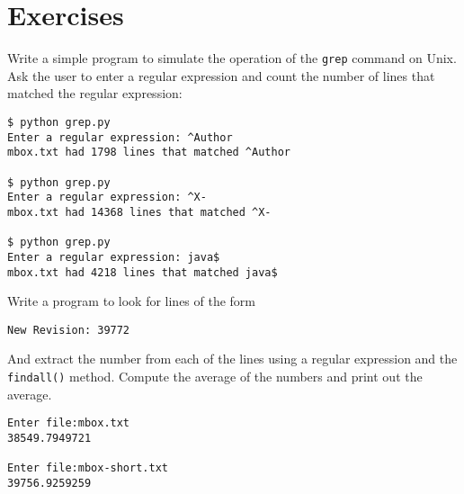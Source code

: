 \section{Exercises}

\begin{ex}
Write a simple program to simulate the operation of the {\tt grep} command 
on Unix.  Ask the user to enter a regular expression and count the number
of lines that matched the regular expression:

\beforeverb
\begin{verbatim}
$ python grep.py
Enter a regular expression: ^Author
mbox.txt had 1798 lines that matched ^Author

$ python grep.py
Enter a regular expression: ^X-
mbox.txt had 14368 lines that matched ^X-

$ python grep.py
Enter a regular expression: java$
mbox.txt had 4218 lines that matched java$
\end{verbatim}
\afterverb
%
\end{ex}

\begin{ex}
Write a program to look for lines of the form

\verb"New Revision: 39772"

And extract the number from each of the lines using a regular expression
and the {\tt findall()} method.  Compute the average of the numbers and 
print out the average.

\beforeverb
\begin{verbatim}
Enter file:mbox.txt 
38549.7949721

Enter file:mbox-short.txt
39756.9259259
\end{verbatim}
\afterverb
%

\end{ex}

